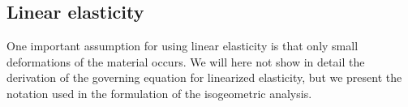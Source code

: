 
\subsection{Linear elasticity}
One important assumption for using linear elasticity is that only small deformations of the material occurs. We will here not show in detail the derivation of the governing equation for linearized elasticity, but we present the notation used in the formulation of the isogeometric analysis. 

